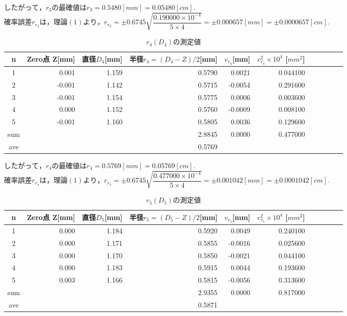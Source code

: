 \documentclass[a4paper,1pt]{jsarticle}
\begin{document}
$したがって，r_3の最確値はr_3=0.5480[mm]=0.05480[cm].$\\

$確率誤差r_{r_3}は，理論(1)より，r_{r_3}=\pm0.6745\sqrt{\dfrac{0.190000\times10^{-4}}{5\times4}}=\pm0.000657[mm]=\pm0.0000657[cm].$

\begin{table}[H]
  \caption{$r_4(D_4)$の測定値}
  \label{table:SpeedOfLight}
  \centering
  \begin{tabular}{|c||r|r|r|r|r|r|r|r|r|r|}
    \hline
    n & Zero点 Z[mm]& 直径$D_4 $[mm] & 半径$r_4=(D_4-Z)/2$[mm] & $v_{r_4}$[mm] & $v_{r_4}^2\times 10^4$ [$mm^2$] \\
    \hline\hline
    1 & 0.001 & 1.159 & 0.5790 & 0.0021 & 0.044100 \\
    2 & -0.001 & 1.142 & 0.5715 & -0.0054 & 0.291600 \\
    3 & -0.001 & 1.154 & 0.5775 & 0.0006 & 0.003600 \\
    4 & 0.000 & 1.152 & 0.5760 & -0.0009 & 0.008100 \\
    5 & -0.001 & 1.160 & 0.5805 & 0.0036 & 0.129600 \\

    \hline\hline
    sum & & & 2.8845 & 0.0000 & 0.477000 \\

    \hline
    ave & & & 0.5769 & &  \\

    \hline
  \end{tabular}


\end{table}

$したがって，r_4の最確値はr_4=0.5769[mm]=0.05769[cm].$\\

$確率誤差r_{r_4}は，理論(1)より，r_{r_4}=\pm0.6745\sqrt{\dfrac{0.477000\times10^{-4}}{5\times4}}=\pm0.001042[mm]=\pm0.0001042[cm].$

\begin{table}[H]
  \caption{$r_5(D_5)$の測定値}
  \label{table:SpeedOfLight}
  \centering
  \begin{tabular}{|c||r|r|r|r|r|r|r|r|r|r|}
    \hline
    n & Zero点 Z[mm]& 直径$D_5 $[mm] & 半径$r_5=(D_5-Z)/2$[mm] & $v_{r_5}$[mm] & $v_{r_5}^2\times 10^4$ [$mm^2$] \\
    \hline\hline
    1 & 0.000 & 1.184 & 0.5920 & 0.0049 & 0.240100 \\
    2 & 0.000 & 1.171 & 0.5855 & -0.0016 & 0.025600 \\
    3 & 0.000 & 1.170 & 0.5850 & -0.0021 & 0.044100 \\
    4 & 0.000 & 1.183 & 0.5915 & 0.0044 & 0.193600 \\
    5 & 0.003 & 1.166 & 0.5815 & -0.0056 & 0.313600 \\


    \hline\hline
    sum & & & 2.9355 & 0.0000 & 0.817000 \\
    \hline
    ave & & & 0.5871 & &  \\

    \hline
  \end{tabular}


\end{table}
\end{document}
